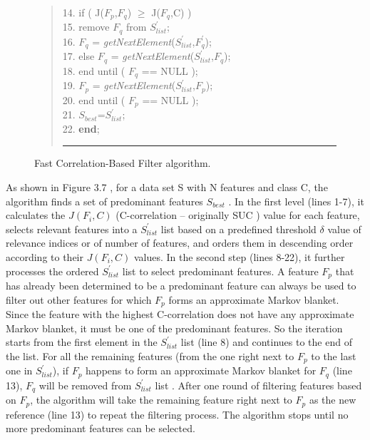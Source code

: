 \documentclass[a4paper,fleqn]{report}
\begin{document}
\begin{figure}[!h]
\begin{quote}
14.\hspace{1.8cm}                       if ( J($F_{p}$,$F_{q}$) $\geq$ J($F_{q}$,C) ) \\
15.\hspace{2.1cm}                   remove $F_{q}$ from $S^{'}_{list}$; \\
16.\hspace{2.1cm}                 $F_{q}$ = {\it getNextElement}($S^{'}_{list}$,$F_{q}^{'}$); \\
17.\hspace{1.8cm}               else $F_{q}$ = {\it getNextElement}($S^{'}_{list}$,$F_{q}$); \\
18.\hspace{1.6cm}             end until ( $F_{q}$ == NULL ); \\
19.\hspace{1.3cm}           $F_{p}$ = {\it getNextElement}($S^{'}_{list}$,$F_{p}$); \\
20.\hspace{1.1cm}        end until ( $F_{p}$ == NULL ); \\
21.\hspace{0.5cm}        $S_{best}$=$S^{'}_{list}$; \\
22.\hspace{0.5cm}      {\bf end}; \\
\vspace{0.2cm}
\hrule width 3.5 in
\end{quote}
\caption{Fast Correlation-Based Filter algorithm. }
\end{figure} 


As shown in Figure 3.7%
, for a data set S with N features and class C, the algorithm finds a
set of predominant features $S_{best}$ . In the first level (lines 1-7), it calculates the $J\left( F_i, C \right)$ 
(C-correlation -- originally SUC ) value for each feature, selects relevant features into a $S^{'}_{list}$
list based on a predefined threshold $\delta$ value of relevance indices or of number of features, and orders them in 
descending order according to their $J\left( F_i, C \right)$ values. 
In the second step (lines 8-22), it further processes
the ordered $S^{'}_{list}$ list to select predominant features. A feature $F_p$ that has already been determined
to be a predominant feature can always be used to filter out other features for which $F_p$ forms an
approximate Markov blanket. Since the feature with the highest C-correlation does not have any
approximate Markov blanket, it must be one of the predominant features. So the iteration starts
from the first element in the $S^{'}_{list}$ list (line 8) and continues to the end of the list. For all the remaining features (from
the one right next to $F_p$ to the last one in $S^{'}_{list}$), if $F_p$ happens to form an approximate Markov blanket for $F_q$ (line 13), 
$F_q$ will be removed from $S^{'}_{list}$ list . After one round of filtering features based on $F_p$, the algorithm will 
take the remaining feature right next to $F_p$ as the new reference (line 13) to repeat the 
filtering process. The algorithm stops until no more predominant features can be selected. 
%
%
%
%
\end{document}
